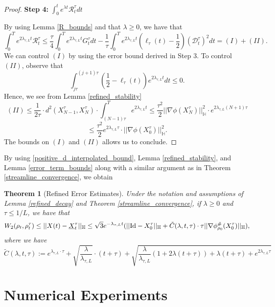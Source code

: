\documentclass[11pt,a4paper]{amsart}
\newcommand{\1}{\mathds{1}}
\newtheorem{theorem}{\textbf{Theorem}}[section]
\numberwithin{equation}{section}
\begin{document}
\begin{proof}
\noindent \textbf{Step 4:} $\int_0^t e^{\lambda t} \mathcal{R}_t^{\tau} dt$ \smallskip

By using Lemma \ref{R_bounds} and that $\lambda \geq 0$, we have that
\[ \int_0^T e^{2\lambda_{\tau,L} t}\mathcal{R}_t^{\tau} \leq  \frac{\tau}{4} \int_0^T e^{2\lambda_{\tau,L}t } G_t^{\tau} dt -  \frac{1}{\tau}\int_0^T e^{2\lambda_{\tau,L}t } (\ell_{\tau}(t)-\frac{1}{2})(\mathcal{D}_t^{\tau})^2 dt = (I) + (II). \]  We can control $(I)$ by using the error bound derived in Step 3. To control $(II)$, observe that
\[ \int_{j \tau}^{(j+1) \tau} \left( \frac{1}{2} - \ell_{\tau}(t) \right) e^{2 \lambda_{\tau,L} t} dt\leq 0. \] Hence, we see from Lemma \ref{refined_stability}
\[ (II) \leq \frac{1}{2 \tau} \cdot d^2(X_{N-1}^{\tau},X_{N}^{\tau}) \cdot \int_{(N-1)\tau}^T e^{2 \lambda_{\tau,L} t} \leq \frac{\tau^2}{2} ||\nabla \phi(X^{\tau}_N)||^2_{\mathbb{H}} \cdot e^{2 \lambda_{\tau,L} (N+1)\tau}  \]
\[ \leq \frac{\tau^2}{2} e^{2 \lambda_{\tau,L} \tau} \cdot ||\nabla \phi(X_0^{\tau})||^2_{\mathbb{H}}. \] The bounds on $(I)$ and $(II)$ allows us to conclude.

 \end{proof}

By using \eqref{positive_d_interpolated_bound}, Lemma \ref{refined_stability}, and Lemma \ref{error_term_bounds} along with a similar argument as in Theorem \ref{streamline_convergence}, we obtain

\begin{theorem}[Refined Error Estimates] \label{refined_convergence} Under the notation and assumptions of Lemma \ref{refined_decay} and Theorem \ref{streamline_convergence}, if $\lambda \geq 0$ and $\tau \leq 1/L$, we have that
\[ W_2(\rho_t,\rho_t^{\tau}) \leq ||X(t)-\underline{X}_t^{\tau}||_{\mathbb{H}} \leq \sqrt{3}e^{-\lambda_{\tau,L} t} (||\textnormal{Id} - X_0^{\tau}||_{\mathbb{H}} + \tilde{C}(\lambda,t,\tau) \cdot \tau ||\nabla \phi^{\#}_{\rho_0}(X_0^{\tau})||_{\mathbb{H}}),  \] where we have
\[ \tilde{C}(\lambda,t,\tau) := e^{\lambda_{\tau,L} \cdot \tau} + \sqrt{\frac{\lambda}{  \lambda_{\tau,L}}} \cdot (t+\tau) + \sqrt{ \frac{\lambda}{\lambda_{\tau,L}} \left(1+2\lambda(t+\tau) \right) + \lambda (t+\tau)  + e^{2 \lambda_{\tau,L} \tau}   }     \]
\end{theorem}


\section{Numerical Experiments} \label{sec:experiments}
\end{document}
